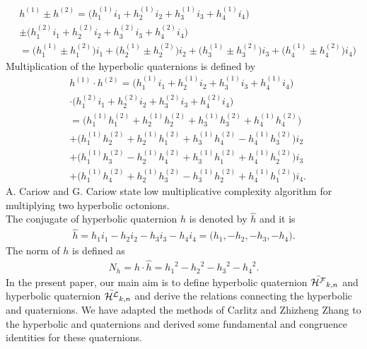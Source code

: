 \begin{align*}
&h^{(1)}\pm h^{(2)}=\big(h^{(1)}_1i_1+h^{(1)}_2i_2+h^{(1)}_3i_3+h^{(1)}_4i_4\big)\\&\pm \big( h^{(2)}_1i_1+h^{(2)}_2i_2+h^{(2)}_3i_3+h^{(2)}_4i_4\big)\\
&=\big(h^{(1)}_1\pm h^{(2)}_1\big)i_1+\big(h^{(1)}_2\pm h^{(2)}_2\big)i_2+\big(h^{(1)}_3\pm h^{(2)}_3\big)i_3+\big(h^{(1)}_4\pm h^{(2)}_4\big)i_4\big)
\end{align*}
Multiplication of the hyperbolic quaternions is defined by
\begin{align*}
&h^{(1)}\cdot h^{(2)}=\big(h^{(1)}_1i_1+h^{(1)}_2i_2+h^{(1)}_3i_3+h^{(1)}_4i_4\big)\\&\cdot\big( h^{(2)}_1i_1+h^{(2)}_2i_2+h^{(2)}_3i_3+h^{(2)}_4i_4\big)\\
&=\big(h^{(1)}_1h^{(2)}_1+ h^{(1)}_2h^{(2)}_2+h^{(1)}_3h^{(2)}_3+h^{(1)}_4h^{(2)}_4\big)\\&+\big(h^{(1)}_1h^{(2)}_2+ h^{(1)}_2h^{(2)}_1+h^{(1)}_3h^{(2)}_4-h^{(1)}_4h^{(2)}_3\big)i_2\\
&+\big(h^{(1)}_1h^{(2)}_3- h^{(1)}_2h^{(2)}_4+h^{(1)}_3h^{(2)}_1+h^{(1)}_4h^{(2)}_2\big)i_3\\
&+\big(h^{(1)}_1h^{(2)}_4+ h^{(1)}_2h^{(2)}_3-h^{(1)}_3h^{(2)}_2+h^{(1)}_4h^{(2)}_1\big)i_4.
\end{align*}
A. Cariow and G. Cariow \cite{28} state low multiplicative complexity algorithm for multiplying two hyperbolic octonions.\\
The conjugate of hyperbolic quaternion $h$ is denoted by $\widehat{h}$ and it is
\begin{align*}
\widehat{h}=h_1i_1-h_2i_2-h_3i_3-h_4i_4=\big(h_1, -h_2, -h_3, -h_4\big).
\end{align*}
The norm of $h$ is defined as
\begin{align*}
N_h=h\cdot\widehat{h}={h_1}^2-{h_2}^2-{h_3}^2-{h_4}^2.
\end{align*}
In the present paper, our main aim is to define hyperbolic \kF\hspace{1mm} quaternion $\bar{{\mathcal{H^F}}}_{k,n}$ and hyperbolic \kL\hspace{1mm} quaternion $\bar{{\mathcal{H^L}}}_{k,n}$ and  derive the relations connecting the  hyperbolic \kF\hspace{1mm} and \kL\hspace{1mm} quaternions. We have adapted the methods of Carlitz  \cite{2} and Zhizheng Zhang \cite{3} to the hyperbolic \kF\hspace{1mm} and \kL\hspace{1mm} quaternions and derived some fundamental and congruence identities for these quaternions. 

